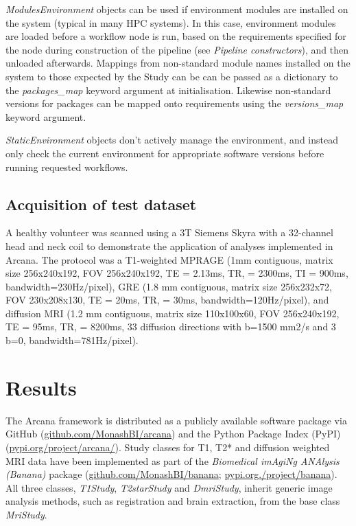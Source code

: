 \documentclass[smallextended]{svjour3}       %
\begin{document}
\emph{ModulesEnvironment} objects can be used if environment
modules \citep{furlani_modules:_1991} are installed on the system (typical in many
HPC systems). In this case, environment modules are loaded before a workflow node is run,
based on the requirements specified for the node during construction of the pipeline
(see \emph{Pipeline constructors}), and then unloaded afterwards. Mappings from non-standard
module names installed on the system to those expected by the Study can be
can be passed as a dictionary to the \emph{packages\_map} keyword argument
at initialisation. Likewise non-standard versions for packages can be mapped onto
requirements using the \emph{versions\_map} keyword argument.

\emph{StaticEnvironment} objects don't actively manage the environment,
and instead only check the current environment for appropriate software
versions before running requested workflows.

\subsection*{Acquisition of test dataset}

A healthy volunteer was scanned using a 3T Siemens Skyra with a 32-channel head
and neck coil to demonstrate the application of analyses implemented in
Arcana. The protocol was a T1-weighted MPRAGE (1mm contiguous,
matrix size 256x240x192, FOV 256x240x192, TE = 2.13ms, TR, = 2300ms, TI
= 900ms, bandwidth=230Hz/pixel), GRE (1.8 mm contiguous, matrix size
256x232x72, FOV 230x208x130, TE = 20ms, TR, = 30ms,
bandwidth=120Hz/pixel), and diffusion MRI (1.2 mm contiguous, matrix size
110x100x60, FOV 256x240x192, TE = 95ms, TR, = 8200ms, 33 diffusion
directions with b=1500 mm2/s and 3 b=0, bandwidth=781Hz/pixel).

\section*{Results}
\label{results}

The Arcana framework is distributed as a publicly available software
package via GitHub (\url{github.com/MonashBI/arcana}) and the
Python Package Index (PyPI) (\url{pypi.org/project/arcana/}).
Study classes for T1, T2* and diffusion weighted MRI data have been
implemented as part of the \emph{Biomedical imAgiNg ANAlysis (Banana)} package
(\url{github.com/MonashBI/banana}; \url{pypi.org./project/banana}).
All three classes, \emph{T1Study}, \emph{T2starStudy} and
\emph{DmriStudy}, inherit generic image analysis methods, such as
registration and brain extraction, from the base class \emph{MriStudy}.
\end{document}
